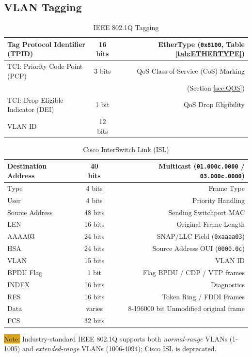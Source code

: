 \documentclass[12pt]{article}
\newcommand{\note}[1]{\colorbox{#1}{Note:}}
\begin{document}
	\subsection{VLAN Tagging \label{subsec:VLAN TAGGING}}
	\begin{table}[H]
	\centering
	\caption{IEEE 802.1Q Tagging \label{tab:802.1Q}}
	\begin{tabular}{| l | c | r |}
	\hline
	Tag Protocol Identifier (TPID)		& 16 bits	& EtherType (\texttt{0x8100}, Table \ref{tab:ETHERTYPE})\\\hline
	TCI: Priority Code Point (PCP)		& 3 bits	& QoS Class-of-Service (CoS) Marking\\
							&		& (Section \ref{sec:QOS})\\\hline
	TCI: Drop Eligible Indicator (DEI)	& 1 bit 	& QoS Drop Eligibility\\\hline
	VLAN ID 					& 12 bits	&\\\hline
	\end{tabular}\end{table}

	\begin{table}[H]
	\centering
	\caption{Cisco InterSwitch Link (ISL) \label{tab:CISCO ISL}}
	\begin{tabular}{| l | c | r |}
	\hline
	Destination Address	& 40 bits	& Multicast (\texttt{01.000c.0000} / \texttt{03.000c.0000})\\\hline
	Type				& 4 bits	& Frame Type\\\hline
	User				& 4 bits	& Priority Handling\\\hline
	Source Address		& 48 bits	& Sending Switchport MAC\\\hline
	LEN				& 16 bits	& Original Frame Length\\\hline
	AAAA03			& 24 bits	& SNAP/LLC Field (\texttt{0xaaaa03})\\\hline
	HSA				& 24 bits	& Source Address OUI (\texttt{0000.0c})\\\hline
	VLAN				& 15 bits	& VLAN ID\\\hline
	BPDU Flag			& 1 bit 	& Flag BPDU / CDP / VTP frames\\\hline
	INDEX			& 16 bits	& Diagnostics\\\hline
	RES				& 16 bits	& Token Ring / FDDI Frames\\\hline
	Data				& varies	& 8-196000 bit Unmodified original frame\\\hline
	FCS				& 32 bits	&\\\hline
	\end{tabular}\end{table}
	\note{Goldenrod} Industry-standard IEEE 802.1Q supports both \textit{normal-range} VLANs (1-1005) and \textit{extended-range} VLANs (1006-4094); Cisco ISL is deprecated.
\end{document}

